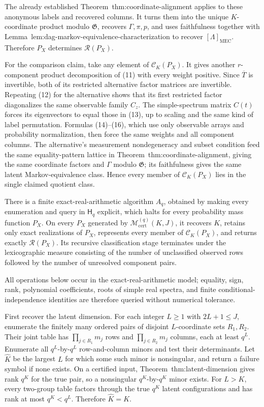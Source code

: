 The already established Theorem~\textnormal{thm:coordinate-alignment} applies to these anonymous labels and recovered columns.  It turns them into the unique \(K\)-coordinate product modulo \(\mathfrak G\), recovers \(\Gamma,\pi,p\), and uses faithfulness together with Lemma~\textnormal{lem:dag-markov-equivalence-characterization} to recover \([\Lambda]_{\mathrm{MEC}}\).  Therefore \(P_X\) determines \(\mathcal R(P_X)\).

For the comparison claim, take any element of \(\mathcal C_K(P_X)\).  It gives another \(r\)-component product decomposition of (11) with every weight positive.  Since \(\overline T\) is invertible, both of its restricted alternative factor matrices are invertible.  Repeating (12) for the alternative shows that its first restricted factor diagonalizes the same observable family \(C_z\).  The simple-spectrum matrix \(C(t)\) forces its eigenvectors to equal those in (13), up to scaling and the same kind of label permutation.  Formulas (14)--(16), which use only observable arrays and probability normalization, then force the same weights and all component columns.  The alternative's measurement nondegeneracy and subset condition feed the same equality-pattern lattice in Theorem~\textnormal{thm:coordinate-alignment}, giving the same coordinate factors and \(\Gamma\) modulo \(\mathfrak G\); its faithfulness gives the same latent Markov-equivalence class.  Hence every member of \(\mathcal C_K(P_X)\) lies in the single claimed quotient class.

There is a finite exact-real-arithmetic algorithm \(A_q\), obtained by making every enumeration and query in \(\mathsf H_q\) explicit, which halts for every probability mass function \(P_X\).  On every \(P_X\) generated by \(\mathcal M_{\mathrm{cert}}^{(q)}(K,J)\), it recovers \(K\), retains only exact realizations of \(P_X\), represents every member of \(\mathcal C_K(P_X)\), and returns exactly \(\mathcal R(P_X)\).  Its recursive classification stage terminates under the lexicographic measure consisting of the number of unclassified observed rows followed by the number of unresolved component pairs.

All operations below occur in the exact-real-arithmetic model; equality, sign, rank, polynomial coefficients, roots of simple real spectra, and finite conditional-independence identities are therefore queried without numerical tolerance.

First recover the latent dimension.  For each integer \(L\ge1\) with \(2L+1\le J\), enumerate the finitely many ordered pairs of disjoint \(L\)-coordinate sets \(R_1,R_2\).  Their joint table has \(\prod_{j\in R_1}m_j\) rows and \(\prod_{j\in R_2}m_j\) columns, each at least \(q^L\).  Enumerate all \(q^L\)-by-\(q^L\) row-and-column minors and test their determinants.  Let \(\widehat K\) be the largest \(L\) for which some such minor is nonsingular, and return a failure symbol if none exists.  On a certified input, Theorem~\textnormal{thm:latent-dimension} gives rank \(q^K\) for the true pair, so a nonsingular \(q^K\)-by-\(q^K\) minor exists.  For \(L>K\), every two-group table factors through the true \(q^K\) latent configurations and has rank at most \(q^K<q^L\).  Therefore \(\widehat K=K\).

